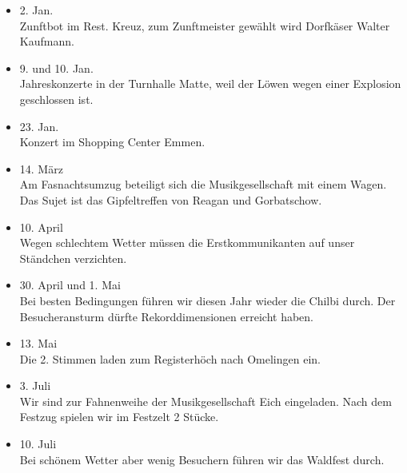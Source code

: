 \begin{history}


    \begin{itemize}

        \item[]2. Jan.\\
        Zunftbot im Rest. Kreuz, zum Zunftmeister gewählt wird Dorfkäser Walter
        Kaufmann.

        \item[]9. und 10. Jan.\\
        Jahreskonzerte in der Turnhalle Matte, weil der Löwen wegen einer
        Explosion geschlossen ist.

        \item[]23. Jan.\\
        Konzert im Shopping Center Emmen.

        \item[]14. März\\
        Am Fasnachtsumzug beteiligt sich die Musikgesellschaft mit einem Wagen.
        Das Sujet ist das Gipfeltreffen von Reagan und Gorbatschow.

        \item[]10. April\\
        Wegen schlechtem Wetter müssen die Erstkommunikanten auf unser Ständchen
        verzichten.

        \item[]30. April und 1. Mai\\
        Bei besten Bedingungen führen wir diesen Jahr wieder die Chilbi durch.
        Der Besucheransturm dürfte Rekorddimensionen erreicht haben.

        \item[]13. Mai\\
        Die 2. Stimmen laden zum Registerhöch nach Omelingen ein.

        \item[]3. Juli\\
        Wir sind zur Fahnenweihe der Musikgesellschaft Eich eingeladen. Nach dem
        Festzug spielen wir im Festzelt 2 Stücke.

        \item[]10. Juli\\
        Bei schönem Wetter aber wenig Besuchern führen wir das Waldfest durch.


\end{itemize}
\end{history}
